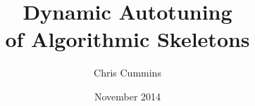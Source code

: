 \title{Dynamic Autotuning\\of Algorithmic Skeletons}
\author{Chris Cummins}
\date{November 2014}





\begin{center}
  \huge
  \textbf{\@title}
  \vspace{.5em}

  \normalsize
  \@author\\
  \@date
  \vspace{.5em}
\end{center}



